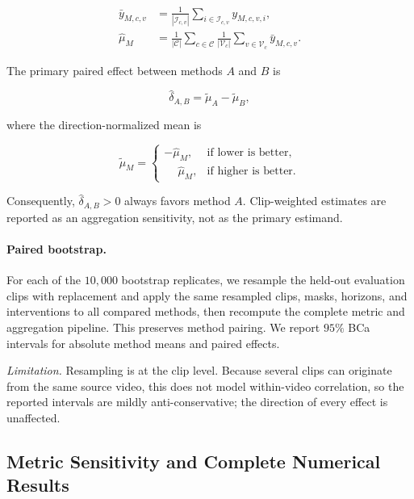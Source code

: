\begin{equation*}
\begin{aligned}
\bar y_{M,c,v}
&=
\frac{1}{|\mathcal I_{c,v}|}
\sum_{i\in\mathcal I_{c,v}}
y_{M,c,v,i},
\\
\widehat\mu_M
&=
\frac{1}{|\mathcal C|}
\sum_{c\in\mathcal C}
\frac{1}{|\mathcal V_c|}
\sum_{v\in\mathcal V_c}
\bar y_{M,c,v}.
\end{aligned}
\end{equation*}

The primary paired effect between methods \(A\) and \(B\) is

\begin{equation*}
\widehat\delta_{A,B}
=
\widetilde\mu_A
-
\widetilde\mu_B,
\end{equation*}

where the direction-normalized mean is

\begin{equation*}
\widetilde\mu_M
=
\begin{cases}
-\widehat\mu_M, & \text{if lower is better},\\
\phantom{-}\widehat\mu_M, & \text{if higher is better}.
\end{cases}
\end{equation*}

Consequently, \(\widehat\delta_{A,B}>0\) always favors method \(A\).
Clip-weighted estimates are reported as an aggregation sensitivity,
not as the primary estimand.

\paragraph{Paired bootstrap.}
For each of the \(10{,}000\) bootstrap replicates, we resample the
held-out evaluation clips with replacement and apply the same resampled
clips, masks, horizons, and interventions to all compared methods, then
recompute the complete metric and aggregation pipeline. This preserves
method pairing. We report \(95\%\) BCa intervals for absolute method
means and paired effects.

\emph{Limitation.} Resampling is at the clip level. Because several clips
can originate from the same source video, this does not model
within-video correlation, so the reported intervals are mildly
anti-conservative; the direction of every effect is unaffected.


\subsection{Metric Sensitivity and Complete Numerical Results}
\label{app:metric_robustness}

